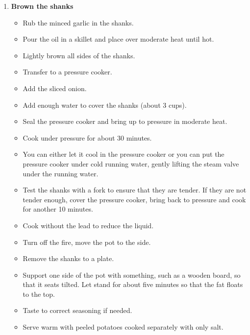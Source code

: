 \documentclass[11pt,letterpaper]{article}
\newcommand \fileName {PorkKnuckle}
\begin{document}
\begin{description}
\begin{enumerate}
	\item {\bf Brown the shanks}
	\begin{itemize}
	\item Rub the minced garlic in the shanks.
	\item Pour the oil in a skillet and place over moderate heat until hot.
	\item Lightly brown all sides of the shanks.
	\item Transfer to a pressure cooker.
	\item Add the sliced onion.
	\item Add enough water to cover the shanks (about 3 cups).
	\item Seal the pressure cooker and bring up to pressure in moderate heat.
	\item Cook under pressure for about 30 minutes.
	\item You can either let it cool in the pressure cooker or you can put the pressure cooker under cold  running water, gently lifting the steam valve under the running water.
	\item Test the shanks with a fork to ensure that they are tender. If they are not tender enough, cover the pressure cooker, bring back to pressure and cook for another 10 minutes.
	\item Cook without the lead to reduce the liquid.
	\item Turn off the fire, move the pot to the side.
	\item Remove the shanks to a plate.
	\item Support one side of the pot with something, such as a wooden board, so that it seats tilted. Let stand for about five minutes so that the fat floats to the top.
	\item Taste to correct seasoning if needed.
	\item Serve warm with peeled potatoes cooked separately with only salt.
	\end{itemize}
	\end{enumerate}
\end{description}

\end{document}
